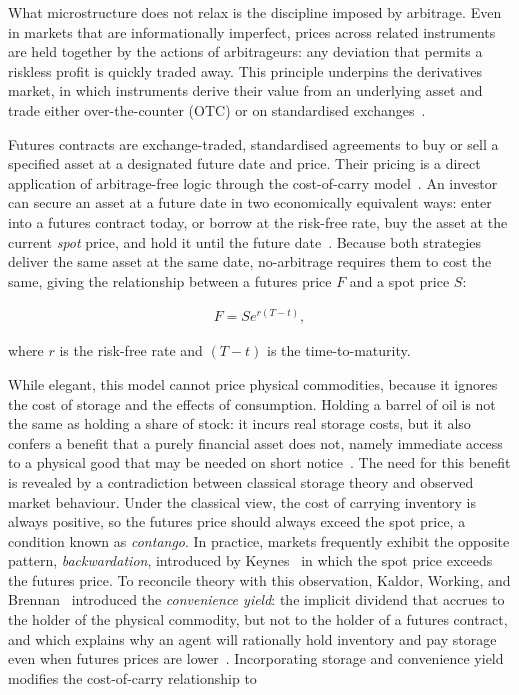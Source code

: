 \documentclass[11pt, a4paper]{article}
\begin{document}
What microstructure does not relax is the discipline imposed by arbitrage. Even in markets that are informationally imperfect, prices across related instruments are held together by the actions of arbitrageurs: any deviation that permits a riskless profit is quickly traded away. This principle underpins the derivatives market, in which instruments derive their value from an underlying asset and trade either over-the-counter (OTC) or on standardised exchanges~\cite{Hull2022OptionsDerivatives}.

Futures contracts are exchange-traded, standardised agreements to buy or sell a specified asset at a designated future date and price. Their pricing is a direct application of arbitrage-free logic through the cost-of-carry model~\cite{Hull2022OptionsDerivatives}. An investor can secure an asset at a future date in two economically equivalent ways: enter into a futures contract today, or borrow at the risk-free rate, buy the asset at the current \textit{spot} price, and hold it until the future date~\cite{Hull2022OptionsDerivatives}. Because both strategies deliver the same asset at the same date, no-arbitrage requires them to cost the same, giving the relationship between a futures price $F$ and a spot price $S$:

\begin{align} \label{eq:futures_simple}
F = Se^{r(T-t)},
\end{align}

where $r$ is the risk-free rate and $(T-t)$ is the time-to-maturity.

While elegant, this model cannot price physical commodities, because it ignores the cost of storage and the effects of consumption. Holding a barrel of oil is not the same as holding a share of stock: it incurs real storage costs, but it also confers a benefit that a purely financial asset does not, namely immediate access to a physical good that may be needed on short notice~\cite{Hull2022OptionsDerivatives}. The need for this benefit is revealed by a contradiction between classical storage theory and observed market behaviour. Under the classical view, the cost of carrying inventory is always positive, so the futures price should always exceed the spot price, a condition known as \textit{contango}. In practice, markets frequently exhibit the opposite pattern, \textit{backwardation}, introduced by Keynes~\cite{Keynes1930AMoney} in which the spot price exceeds the futures price. To reconcile theory with this observation, Kaldor, Working, and Brennan~\cite{Kaldor1939Source:Studies, Working1949TheStorage, Brennan1958TheStorage} introduced the \textit{convenience yield}: the implicit dividend that accrues to the holder of the physical commodity, but not to the holder of a futures contract, and which explains why an agent will rationally hold inventory and pay storage even when futures prices are lower~\cite{Caumon2004RedefiningMarket}. Incorporating storage and convenience yield modifies the cost-of-carry relationship to
\end{document}
